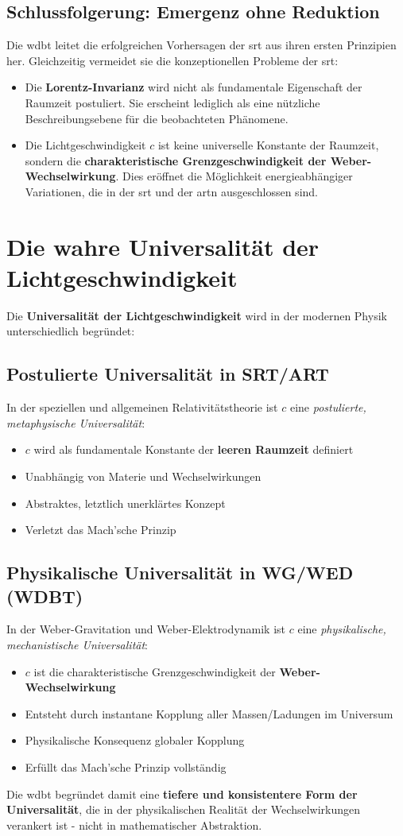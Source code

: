 \subsection{Schlussfolgerung: Emergenz ohne Reduktion}
Die \gls{wdbt} leitet die erfolgreichen Vorhersagen der \gls{srt} aus ihren ersten Prinzipien her. Gleichzeitig vermeidet sie die konzeptionellen Probleme der \gls{srt}:

\begin{itemize}
    \item Die \textbf{Lorentz-Invarianz} wird nicht als fundamentale Eigenschaft der Raumzeit postuliert. Sie erscheint lediglich als eine nützliche Beschreibungsebene für die beobachteten Phänomene.
    \item Die Lichtgeschwindigkeit $c$ ist keine universelle Konstante der Raumzeit, sondern die \textbf{charakteristische Grenzgeschwindigkeit der Weber-Wechselwirkung}. Dies eröffnet die Möglichkeit energieabhängiger Variationen, die in der \gls{srt} und der \gls{artn} ausgeschlossen sind.
\end{itemize}

\section{Die wahre Universalität der Lichtgeschwindigkeit}

Die \textbf{Universalität der Lichtgeschwindigkeit} wird in der modernen Physik unterschiedlich begründet:

\subsection{Postulierte Universalität in SRT/ART}
In der speziellen und allgemeinen Relativitätstheorie ist $c$ eine \textit{postulierte, metaphysische Universalität}:
\begin{itemize}
    \item $c$ wird als fundamentale Konstante der \textbf{leeren Raumzeit} definiert
    \item Unabhängig von Materie und Wechselwirkungen
    \item Abstraktes, letztlich unerklärtes Konzept
    \item Verletzt das Mach'sche Prinzip
\end{itemize}

\subsection{Physikalische Universalität in WG/WED (WDBT)}
In der Weber-Gravitation und Weber-Elektrodynamik ist $c$ eine \textit{physikalische, mechanistische Universalität}:
\begin{itemize}
    \item $c$ ist die charakteristische Grenzgeschwindigkeit der \textbf{Weber-Wechselwirkung}
    \item Entsteht durch instantane Kopplung aller Massen/Ladungen im Universum
    \item Physikalische Konsequenz globaler Kopplung
    \item Erfüllt das Mach'sche Prinzip vollständig
\end{itemize}

Die \gls{wdbt} begründet damit eine \textbf{tiefere und konsistentere Form der Universalität}, die in der physikalischen Realität der Wechselwirkungen verankert ist - nicht in mathematischer Abstraktion.
